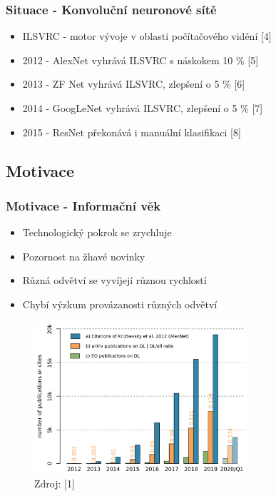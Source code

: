 \documentclass[10pt, t]{beamer}
\begin{document}
\begin{frame}

\frametitle{Situace - Konvoluční neuronové sítě}

\begin{itemize}
	\item ILSVRC - motor vývoje v oblasti počítačového vidění [4]
	\item<2-> 2012 - AlexNet vyhrává ILSVRC s náskokem 10 \% [5]
	\item<3-> 2013 - ZF Net vyhrává ILSVRC, zlepšení o 5 \% [6]
	\item<4-> 2014 - GoogLeNet vyhrává ILSVRC, zlepšení o 5 \% [7]
	\item<5-> 2015 - ResNet překonává i manuální klasifikaci [8]
\end{itemize}

\end{frame}


\subsection{Motivace}


\begin{frame}

\frametitle{Motivace - Informační věk}

\begin{itemize}
	\item Technologický pokrok se zrychluje
	\item Pozornost na žhavé novinky
	\item Různá odvětví se vyvíjejí různou rychlostí
	\item Chybí výzkum provázanosti různých odvětví
\end{itemize}

\begin{figure}[ht]
	\includegraphics[width=0.7\textwidth]{../pictures/dl-papers.png}
	\caption{Zdroj: [1]}
\end{figure}

\end{frame}
\end{document}
